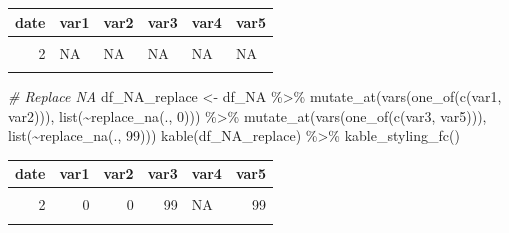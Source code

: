 \documentclass[
]{book}
\newenvironment{Shaded}{\begin{snugshade}}{\end{snugshade}}
\newcommand{\CommentTok}[1]{\textcolor[rgb]{0.56,0.35,0.01}{\textit{#1}}}
\newcommand{\DecValTok}[1]{\textcolor[rgb]{0.00,0.00,0.81}{#1}}
\newcommand{\FunctionTok}[1]{\textcolor[rgb]{0.00,0.00,0.00}{#1}}
\newcommand{\NormalTok}[1]{#1}
\newcommand{\OtherTok}[1]{\textcolor[rgb]{0.56,0.35,0.01}{#1}}
\newcommand{\SpecialCharTok}[1]{\textcolor[rgb]{0.00,0.00,0.00}{#1}}
\newcommand{\StringTok}[1]{\textcolor[rgb]{0.31,0.60,0.02}{#1}}
\begin{document}
\begin{table}[!h]
\centering
\begin{tabular}{r|l|l|l|l|l}
\hline
date & var1 & var2 & var3 & var4 & var5\\
\hline
\cellcolor{gray!6}{1} & \cellcolor{gray!6}{NA} & \cellcolor{gray!6}{NA} & \cellcolor{gray!6}{NA} & \cellcolor{gray!6}{NA} & \cellcolor{gray!6}{NA}\\
\hline
2 & NA & NA & NA & NA & NA\\
\hline
\cellcolor{gray!6}{3} & \cellcolor{gray!6}{NA} & \cellcolor{gray!6}{NA} & \cellcolor{gray!6}{NA} & \cellcolor{gray!6}{NA} & \cellcolor{gray!6}{NA}\\
\hline
\end{tabular}
\end{table}

\begin{Shaded}
\begin{Highlighting}[]
\CommentTok{\# Replace NA}
\NormalTok{df\_NA\_replace }\OtherTok{\textless{}{-}}\NormalTok{ df\_NA }\SpecialCharTok{\%\textgreater{}\%}
  \FunctionTok{mutate\_at}\NormalTok{(}\FunctionTok{vars}\NormalTok{(}\FunctionTok{one\_of}\NormalTok{(}\FunctionTok{c}\NormalTok{(}\StringTok{\textquotesingle{}var1\textquotesingle{}}\NormalTok{, }\StringTok{\textquotesingle{}var2\textquotesingle{}}\NormalTok{))), }\FunctionTok{list}\NormalTok{(}\SpecialCharTok{\textasciitilde{}}\FunctionTok{replace\_na}\NormalTok{(., }\DecValTok{0}\NormalTok{))) }\SpecialCharTok{\%\textgreater{}\%}
  \FunctionTok{mutate\_at}\NormalTok{(}\FunctionTok{vars}\NormalTok{(}\FunctionTok{one\_of}\NormalTok{(}\FunctionTok{c}\NormalTok{(}\StringTok{\textquotesingle{}var3\textquotesingle{}}\NormalTok{, }\StringTok{\textquotesingle{}var5\textquotesingle{}}\NormalTok{))), }\FunctionTok{list}\NormalTok{(}\SpecialCharTok{\textasciitilde{}}\FunctionTok{replace\_na}\NormalTok{(., }\DecValTok{99}\NormalTok{)))}
\FunctionTok{kable}\NormalTok{(df\_NA\_replace) }\SpecialCharTok{\%\textgreater{}\%}
  \FunctionTok{kable\_styling\_fc}\NormalTok{()}
\end{Highlighting}
\end{Shaded}

\begin{table}[!h]
\centering
\begin{tabular}{r|r|r|r|l|r}
\hline
date & var1 & var2 & var3 & var4 & var5\\
\hline
\cellcolor{gray!6}{1} & \cellcolor{gray!6}{0} & \cellcolor{gray!6}{0} & \cellcolor{gray!6}{99} & \cellcolor{gray!6}{NA} & \cellcolor{gray!6}{99}\\
\hline
2 & 0 & 0 & 99 & NA & 99\\
\hline
\cellcolor{gray!6}{3} & \cellcolor{gray!6}{0} & \cellcolor{gray!6}{0} & \cellcolor{gray!6}{99} & \cellcolor{gray!6}{NA} & \cellcolor{gray!6}{99}\\
\hline
\end{tabular}
\end{table}
\end{document}

